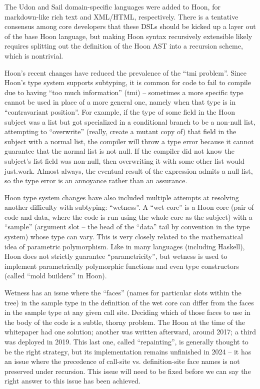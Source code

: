 \documentclass[twoside]{article}
\begin{document}
The Udon and Sail domain-specific languages were added to Hoon, for markdown-like rich text and XML/HTML, respectively.  There is a tentative consensus among core developers that these DSLs should be kicked up a layer out of the base Hoon language, but making Hoon syntax recursively extensible likely requires splitting out the definition of the Hoon AST into a recursion scheme, which is nontrivial.

Hoon's recent changes have reduced the prevalence of the ``{\sc tmi} problem''.  Since Hoon's type system supports subtyping, it is common for code to fail to compile due to having ``too much information'' ({\sc tmi}) – sometimes a more specific type cannot be used in place of a more general one, namely when that type is in ``contravariant position''.  For example, if the type of some field in the Hoon subject was a list but got specialized in a conditional branch to be a non-null list, attempting to ``overwrite'' (really, create a mutant copy of) that field in the subject with a normal list, the compiler will throw a type error because it cannot guarantee that the normal list is not null.  If the compiler did not know the subject's list field was non-null, then overwriting it with some other list would just.work.  Almost always, the eventual result of the expression admits a null list, so the type error is an annoyance rather than an assurance.

Hoon type system changes have also included multiple attempts at resolving another difficulty with subtyping: ``wetness''.  A ``wet core'' is a Hoon core (pair of code and data, where the code is run using the whole core as the subject) with a ``sample'' (argument slot – the head of the ``data'' tail by convention in the type system) whose type can vary.  This is very closely related to the mathematical idea of parametric polymorphism.  Like in many languages (including Haskell), Hoon does not strictly guarantee ``parametricity'', but wetness is used to implement parametrically polymorphic functions and even type constructors (called ``mold builders'' in Hoon).

Wetness has an issue where the ``faces'' (names for particular slots within the tree) in the sample type in the definition of the wet core can differ from the faces in the sample type at any given call site.  Deciding which of those faces to use in the body of the code is a subtle, thorny problem.  The Hoon at the time of the whitepaper had one solution; another was written afterward, around 2017; a third was deployed in 2019.  This last one, called ``repainting'', is generally thought to be the right strategy, but its implementation remains unfinished in 2024 – it has an issue where the precedence of call-site vs. definition-site face names is not preserved under recursion.  This issue will need to be fixed before we can say the right answer to this issue has been achieved.
\end{document}
